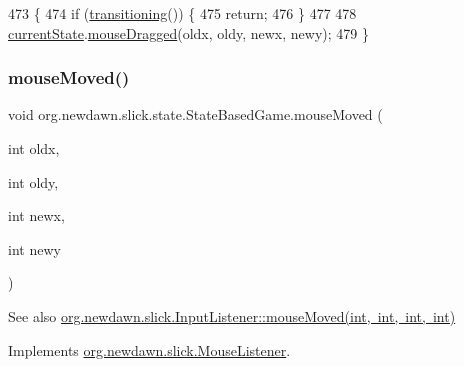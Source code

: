 \begin{DoxyCode}
473                                                                      \{
474         \textcolor{keywordflow}{if} (\mbox{\hyperlink{classorg_1_1newdawn_1_1slick_1_1state_1_1_state_based_game_ae869c08778875776081935a090d4c92f}{transitioning}}()) \{
475             \textcolor{keywordflow}{return};
476         \}
477         
478         \mbox{\hyperlink{classorg_1_1newdawn_1_1slick_1_1state_1_1_state_based_game_a6a45e68094bb9b7ec30b8a8b7d415766}{currentState}}.\mbox{\hyperlink{interfaceorg_1_1newdawn_1_1slick_1_1_mouse_listener_a65022dd6acb492caa47dfd806b207139}{mouseDragged}}(oldx, oldy, newx, newy);
479     \}
\end{DoxyCode}
\mbox{\label{classorg_1_1newdawn_1_1slick_1_1state_1_1_state_based_game_a61aab9c2a3c18c20bf1ed2c50276c818}} 
\subsubsection{\texorpdfstring{mouse\+Moved()}{mouseMoved()}}
{\footnotesize\ttfamily void org.\+newdawn.\+slick.\+state.\+State\+Based\+Game.\+mouse\+Moved (\begin{DoxyParamCaption}\item[{int}]{oldx,  }\item[{int}]{oldy,  }\item[{int}]{newx,  }\item[{int}]{newy }\end{DoxyParamCaption})\hspace{0.3cm}{\ttfamily [inline]}}

\begin{DoxySeeAlso}{See also}
\mbox{\hyperlink{interfaceorg_1_1newdawn_1_1slick_1_1_mouse_listener_ad41216afc84f2c8d38f91e8b2d46bed9}{org.\+newdawn.\+slick.\+Input\+Listener\+::mouse\+Moved(int, int, int, int)}} 
\end{DoxySeeAlso}


Implements \mbox{\hyperlink{interfaceorg_1_1newdawn_1_1slick_1_1_mouse_listener_ad41216afc84f2c8d38f91e8b2d46bed9}{org.\+newdawn.\+slick.\+Mouse\+Listener}}.


